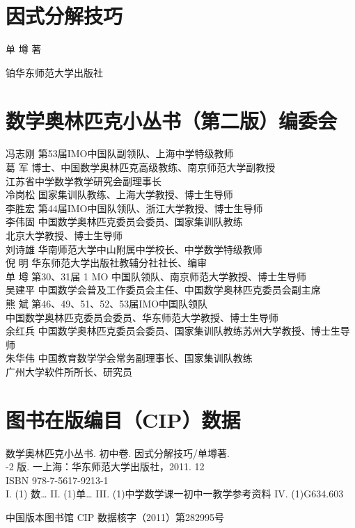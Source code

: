 \documentclass[10pt]{article}
\begin{document}
\section*{因式分解技巧}
单 墫 著

铂华东师范大学出版社

\section*{数学奥林匹克小丛书（第二版）编委会}
冯志刚 第53届IMO中国队副领队、上海中学特级教师\\
葛 军 博士、中国数学奥林匹克高级教练、南京师范大学副教授\\
江苏省中学数学教学研究会副理事长\\
冷岗松 国家集训队教练、上海大学教授、博士生导师\\
李胜宏 第44届IMO中国队领队、浙江大学教授、博士生导师\\
李伟固 中国数学奥林匹克委员会委员、国家集训队教练\\
北京大学教授、博士生导师\\
刘诗雄 华南师范大学中山附属中学校长、中学数学特级教师\\
倪 明 华东师范大学出版社教辅分社社长、编审\\
单 墫 第30、31届 1 MO 中国队领队、南京师范大学教授、博士生导师\\
吴建平 中国数学会普及工作委员会主任、中国数学奥林匹克委员会副主席\\
熊 斌 第46、49、51、52、53届IMO中国队领队\\
中国数学奥林匹克委员会委员、华东师范大学教授、博士生导师\\
余红兵 中国数学奥林匹克委员会委员、国家集训队教练苏州大学教授、博士生导师\\
朱华伟 中国教育数学学会常务副理事长、国家集训队教练\\
广州大学软件所所长、研究员

\section*{图书在版编目（CIP）数据}
数学奥林匹克小丛书. 初中卷. 因式分解技巧/单墫著.\\
-2 版. 一上海：华东师范大学出版社，2011. 12\\
ISBN 978-7-5617-9213-1\\
I. (1) 数… II. (1)单… III. (1)中学数学课一初中一教学参考资料 IV. (1)G634.603

中国版本图书馆 CIP 数据核字（2011）第282995号
\end{document}
